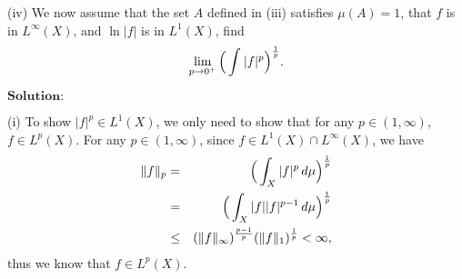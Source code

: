 \documentclass[12pt,a4paper]{ctexart}
\begin{document}
(iv) We now assume that the set $A$ defined in (iii) satisfies $\mu(A) = 1$, that $f$ is in $L^{\infty}(X)$, and $\ln |f|$ is in $L^{1}(X)$, find
\begin{equation*}
    \lim_{p \to 0^{+}} \Big{(} \int_{}^{} |f|^{p} \Big{)}^{\frac{1}{p}}.
\end{equation*}

\vspace{8pt}
$\textbf{Solution:}$

(i) To show $|f|^{p} \in L^{1}(X)$, we only need to show that for any $p \in (1, \infty)$, $f \in L^{p}(X)$. For any $p \in (1, \infty)$, since $f \in L^{1}(X) \cap L^{\infty}(X)$, we have
\begin{eqnarray*}
    \|f\|_{p} &=& \Big{(} \int_{X}^{} |f|^{p} \, d \mu \Big{)}^{\frac{1}{p}} \\
    &=& \Big{(} \int_{X}^{} |f| |f|^{p-1} \, d \mu \Big{)}^{\frac{1}{p}} \\
    & \leq &  (\|f\|_{\infty})^{\frac{p-1}{p}} (\|f\|_{1})^{\frac{1}{p}} < \infty,
\end{eqnarray*}
thus we know that $f \in L^{p}(X)$.

\vspace{8pt}
\end{document}
